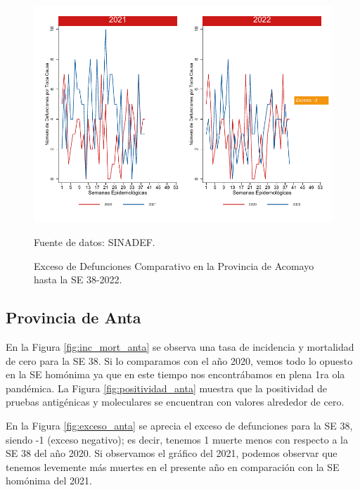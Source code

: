 \documentclass[12pt,a4paper,openany]{book}
\begin{document}
	\begin{figure}[h]
		\caption{Exceso de Defunciones Comparativo en la Provincia de Acomayo hasta la SE 38-2022.}\label{fig:exceso_acomayo}
		\begin{center}
			\includegraphics[width=0.7\linewidth]{../figuras/exceso_1.pdf}
		\end{center}
		{\footnotesize {Fuente de datos: SINADEF.}}
	\end{figure}
	
	\clearpage
	
	\subsection*{Provincia de Anta}
	\noindent En la Figura \ref{fig:inc_mort_anta} se observa una tasa de incidencia y mortalidad de cero para la SE 38. Si lo comparamos con el año 2020, vemos todo lo opuesto en la SE homónima ya que en este tiempo nos encontrábamos en plena 1ra ola pandémica.
	\noindent La Figura
	\ref{fig:positividad_anta} muestra que la positividad de pruebas antigénicas y moleculares se encuentran con valores alrededor de cero.
	
	En la Figura \ref{fig:exceso_anta} se aprecia el exceso de defunciones para la SE 38, siendo -1 (exceso negativo); es decir, tenemos 1 muerte menos con respecto a la SE 38 del año 2020. Si observamos el gráfico del 2021, podemos observar que tenemos levemente más muertes en el presente año en comparación con la SE homónima del 2021.
	
\end{document}

